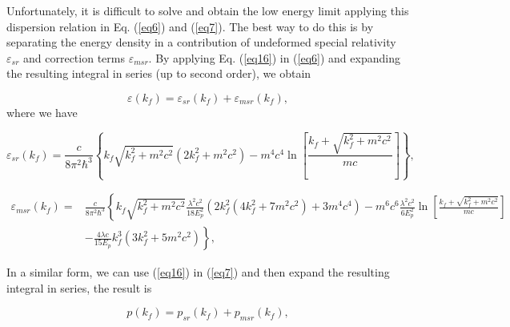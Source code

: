 \documentclass[final,5p,times,twocolumn]{elsarticle}
\begin{document}
Unfortunately, it is difficult to solve and obtain the low energy limit applying this dispersion relation in Eq. (\ref{eq6}) and (\ref{eq7}). The best way to do this is by separating the energy density in a contribution of undeformed special relativity $\varepsilon_{sr}$ and correction terms  $\varepsilon_{msr}$. By applying Eq. (\ref{eq16}) in (\ref{eq6})  and expanding the resulting integral in series (up to second order), we obtain  

\begin{equation}
     \varepsilon(k_f)=\varepsilon_{sr}(k_f)+\varepsilon_{msr}(k_f),
     \label{eq17}
\end{equation}
where we have  
\begin{widetext}
\begin{equation}
     \varepsilon_{sr}(k_f)= \frac{c}{8 \pi ^2 \hbar ^3}\left\{ k_f \sqrt{k_f^2+m^2 c^2} \left(2 k_f^2+m^2 c^2\right) -m^4 c^4 \ln \left[\frac{k_f +\sqrt{k_f^2+m^2 c^2}}{m c}\right]\right\}, 
      \label{eq18}
\end{equation}

\begin{equation}
\begin{split}
     \varepsilon_{msr}(k_f)=&\frac{c}{8 \pi ^2 \hbar ^3}\left\{ k_f \sqrt{k_f^2+m^2 c^2} \frac{\lambda^2 c^2}{18 E_p^2} \right. \left(2 k_f^2 \left( 4 k_f^2+ 7 m^2 c^2\right) +3 m^4 c^4\right) -m^6 c^6 \frac{\lambda^2 c^2}{6 E_p^2} \ln \left[\frac{k_f +\sqrt{k_f^2+m^2 c^2}}{m c}\right] \\
     & \left. -\frac{4 \lambda c}{15 E_p} k_f^3 \left(3 k_f^2+5 m^2 c^2 \right)\right\},  
\end{split}
 \label{eq19}
\end{equation}

\end{widetext}

In a similar form, we can use  (\ref{eq16}) in (\ref{eq7})  and then expand the resulting integral in series, the result is

\begin{equation}
     p(k_f)=p_{sr}(k_f)+p_{msr}(k_f),
      \label{eq20}
\end{equation}
\end{document}

